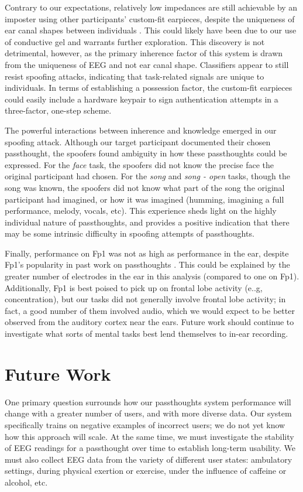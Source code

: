 \documentclass{sigchi}
\begin{document}
Contrary to our expectations, relatively low impedances are still achievable by an imposter using other participants' custom-fit earpieces, despite the uniqueness of ear canal shapes between individuals \cite{Akkermans2005}. This could likely have been due to our use of conductive gel and warrants further exploration. This discovery is not detrimental, however, as the primary inherence factor of this system is drawn from the uniqueness of EEG and not ear canal shape. Classifiers appear to still resist spoofing attacks, indicating that task-related signals are unique to individuals. In terms of establishing a possession factor, the custom-fit earpieces could easily include a hardware keypair to sign authentication attempts in a three-factor, one-step scheme.

The powerful interactions between inherence and knowledge emerged in our spoofing attack. Although our target participant documented their chosen passthought, the spoofers found ambiguity in how these passthoughts could be expressed. For the \textit{face} task, the spoofers did not know the precise face the original participant had chosen. For the \textit{song} and \textit{song - open} tasks, though the song was known, the spoofers did not know what part of the song the original participant had imagined, or how it was imagined (humming, imagining a full performance, melody, vocals, etc). This experience sheds light on the highly individual nature of passthoughts, and provides a positive indication that there may be some intrinsic difficulty in spoofing attempts of passthoughts.

Finally, performance on Fp1 was not as high as performance in the ear, despite Fp1's popularity in past work on passthoughts \cite{Chuang2013b}. This could be explained by the greater number of electrodes in the ear in this analysis (compared to one on Fp1). Additionally, Fp1 is best poised to pick up on frontal lobe activity (e..g, concentration), but our tasks did not generally involve frontal lobe activity; in fact, a good number of them involved audio, which we would expect to be better observed from the auditory cortex near the ears. Future work should continue to investigate what sorts of mental tasks best lend themselves to in-ear recording.

\section{Future Work}

One primary question surrounds how our passthoughts system performance will change with a greater number of users, and with more diverse data. Our system specifically trains on negative examples of incorrect users; we do not yet know how this approach will scale. At the same time, we must investigate the stability of EEG readings for a passthought over time to establish long-term usability. We must also collect EEG data from the variety of different user states: ambulatory settings, during physical exertion or exercise, under the influence of caffeine or alcohol, etc.
\end{document}

